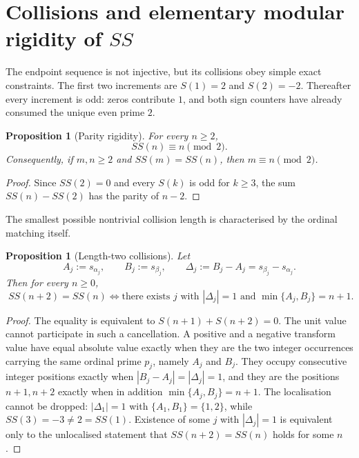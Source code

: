 \documentclass[11pt]{amsart}
\numberwithin{equation}{section}
\theoremstyle{plain}
\newtheorem{proposition}[theorem]{Proposition}
\theoremstyle{definition}
\theoremstyle{remark}
\begin{document}
\section{Collisions and elementary modular rigidity of \texorpdfstring{$SS$}{SS}}
\label{sec:ss-collisions}

The endpoint sequence is not injective, but its collisions obey simple exact
constraints.  The first two increments are $S(1)=2$ and $S(2)=-2$.  Thereafter
every increment is odd: zeros contribute $1$, and both sign counters have
already consumed the unique even prime $2$.

\begin{proposition}[Parity rigidity]
\label{prop:ss-parity}
For every $n\ge2$,
\begin{equation}
\label{eq:ss-parity}
\boxed{\;SS(n)\equiv n\pmod2.\;}
\end{equation}
Consequently, if $m,n\ge2$ and $SS(m)=SS(n)$, then $m\equiv n\pmod2$.
\end{proposition}

\begin{proof}
Since $SS(2)=0$ and every $S(k)$ is odd for $k\ge3$, the sum
$SS(n)-SS(2)$ has the parity of $n-2$.
\end{proof}

The smallest possible nontrivial collision length is characterised by the
ordinal matching itself.

\begin{proposition}[Length-two collisions]
\label{prop:length-two-collision}
Let
\begin{equation}
\label{eq:AB-integer-pairing}
A_j:=s_{\alpha_j},
\qquad
B_j:=s_{\beta_j},
\qquad
\Delta_j:=B_j-A_j=s_{\beta_j}-s_{\alpha_j}.
\end{equation}
Then for every $n\ge0$,
\begin{equation}
\label{eq:length-two-collision}
\boxed{\;SS(n+2)=SS(n)\iff
\text{there exists }j\text{ with }|\Delta_j|=1
\text{ and }\min\{A_j,B_j\}=n+1.\;}
\end{equation}
\end{proposition}

\begin{proof}
The equality is equivalent to $S(n+1)+S(n+2)=0$.  The unit value cannot
participate in such a cancellation.  A positive and a negative transform value
have equal absolute value exactly when they are the two integer occurrences
carrying the same ordinal prime $p_j$, namely $A_j$ and $B_j$.  They occupy
consecutive integer positions exactly when $|B_j-A_j|=|\Delta_j|=1$, and they are
the positions $n+1,n+2$ exactly when in addition $\min\{A_j,B_j\}=n+1$.  The
localisation cannot be dropped: $|\Delta_1|=1$ with $\{A_1,B_1\}=\{1,2\}$, while
$SS(3)=-3\ne2=SS(1)$.  Existence of some $j$ with $|\Delta_j|=1$ is equivalent
only to the unlocalised statement that $SS(n+2)=SS(n)$ holds for some $n$.
\end{proof}
\end{document}
